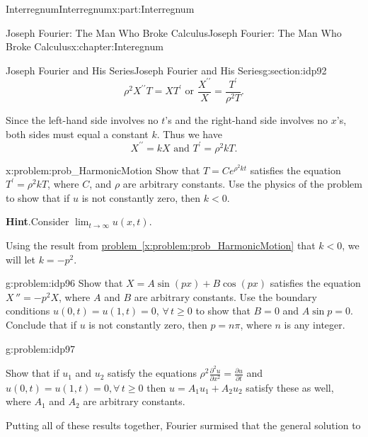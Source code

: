 \begin{partptx}{Interregnum}{}{Interregnum}{}{}{x:part:Interregnum}
\begin{chapterptx}{Joseph Fourier: The Man Who Broke Calculus}{}{Joseph Fourier: The Man Who Broke Calculus}{}{}{x:chapter:Interegnum}
\begin{sectionptx}{Joseph Fourier and His Series}{}{Joseph Fourier and His Series}{}{}{g:section:idp92}
\begin{equation*}
				\rho^2X^{\prime\prime}T=X T^\prime\text{  or  } \frac{X^{\prime\prime}}{X}=\frac{T^\prime}{\rho^2T}\text{.}
			\end{equation*}
			\par
			Since the left-hand side involves no \(t\)'s and the right-hand side involves no \(x\)'s, both sides must equal a constant \(k\). Thus we have%
			\begin{equation*}
				X^{\prime\prime}=k X\text{ and } T^\prime=\rho^2k T\text{.}
			\end{equation*}
			\begin{problem}{}{x:problem:prob_HarmonicMotion}%
				 Show that \(T=Ce^{\rho^2kt}\) satisfies the equation \(T^\prime=\rho^2k T\), where \(C\), and \(\rho\) are arbitrary constants. Use the physics of the problem to show that if \(u\) is not constantly zero, then \(k\lt 0\).%
				\par\smallskip%
				\noindent\textbf{\blocktitlefont Hint}.\hypertarget{g:hint:idp95}{}\quad{}Consider \(\lim_{t\rightarrow\infty}u(x,t)\).%
			\end{problem}
			Using the result from \hyperref[x:problem:prob_HarmonicMotion]{problem~{\xreffont\ref{x:problem:prob_HarmonicMotion}}} that \(k\lt 0\), we will let \(k=-p^2\).%
			\begin{problem}{}{g:problem:idp96}%
				 Show that \(X=A\sin\left(px\right)+B\cos\left(px\right)\) satisfies the equation \(X\,''=-p^2X\), where \(A\) and \(B\) are arbitrary constants. Use the boundary conditions \(u(0,t)=u(1,t)=0\), \(\forall\,t\geq 0\) to show that \(B=0\) and \(A\sin p=0\). Conclude that if \(u\) is not constantly zero, then \(p=n\pi\), where \(n\) is any integer.%
			\end{problem}
			\begin{problem}{}{g:problem:idp97}%
				\par
				Show that if \(u_1\) and \(u_2\) satisfy the equations \(\rho^2\frac{\partial^2u}{\partial x^2}=\frac{\partial
					u}{\partial t}\) and \(u(0,t)=u(1,t)=0, \forall\,t\geq
				0\) then \(u=A_1u_1+A_2u_2\) satisfy these as well, where \(A_1\) and \(A_2\) are arbitrary constants.%
			\end{problem}
			 Putting all of these results together, Fourier surmised that the general solution to%
			\begin{equation*}

\end{equation*}
\end{sectionptx}
\end{chapterptx}
\end{partptx}
